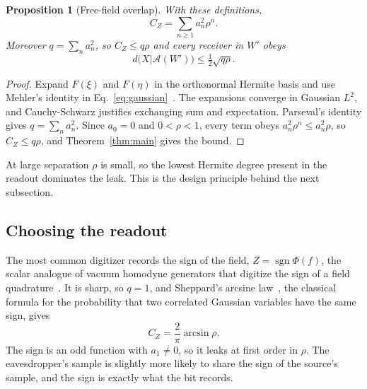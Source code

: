 \documentclass[11pt,a4paper]{article}
\newtheorem{proposition}[theorem]{Proposition}
\newcommand{\A}{\mathcal A}
\newcommand{\sgn}{\operatorname{sgn}}
\begin{document}
\begin{proposition}[Free-field overlap]
\label{prop:free}
With these definitions,
\begin{equation}
 C_Z=\sum_{n\ge1}a_n^2\rho^n .
 \label{eq:mehler}
\end{equation}
Moreover $q=\sum_na_n^2$, so $C_Z\le q\rho$ and every receiver in $W'$ obeys
\begin{equation}
 d\bigl(X|\A(W')\bigr)\le\tfrac12\sqrt{q\rho} .
 \label{eq:ceiling}
\end{equation}
\end{proposition}

\begin{proof}
Expand $F(\xi)$ and $F(\eta)$ in the orthonormal Hermite basis and use Mehler's identity in Eq.~\eqref{eq:gaussian}~\cite{janson1997gaussian}. The expansions converge in Gaussian $L^2$, and Cauchy-Schwarz justifies exchanging sum and expectation. Parseval's identity gives $q=\sum_n a_n^2$. Since $a_0=0$ and $0<\rho<1$, every term obeys $a_n^2\rho^n\le a_n^2\rho$, so $C_Z\le q\rho$, and Theorem~\ref{thm:main} gives the bound.
\end{proof}

At large separation $\rho$ is small, so the lowest Hermite degree present in the readout dominates the leak. This is the design principle behind the next subsection.

\subsection{Choosing the readout}

The most common digitizer records the sign of the field, $Z=\sgn\Phi(f)$, the scalar analogue of vacuum homodyne generators that digitize the sign of a field quadrature~\cite{gabriel2010generator,symul2011real}. It is sharp, so $q=1$, and Sheppard's arcsine law~\cite{sheppard1899application}, the classical formula for the probability that two correlated Gaussian variables have the same sign, gives
\begin{equation}
 C_Z=\frac2\pi\arcsin\rho .
 \label{eq:arcsine}
\end{equation}
The sign is an odd function with $a_1\ne0$, so it leaks at first order in $\rho$. The eavesdropper's sample is slightly more likely to share the sign of the source's sample, and the sign is exactly what the bit records.
\end{document}
